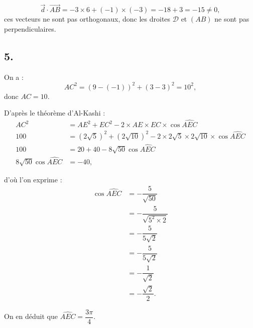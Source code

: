 \[
\vec{d} \cdot \overrightarrow{AB} = -3 \times 6 + (-1) \times (-3) = -18 + 3 = -15 \neq 0,
\]
ces vecteurs ne sont pas orthogonaux, donc les droites \( \mathcal{D} \) et \( (AB) \) ne sont pas perpendiculaires.

\subsection*{5.}

On a :
\[AC^2 = (9 - (-1))^2 + (3 - 3)^2 = 10^2,
\]
donc \( AC = 10 \).

D'après le théorème d'Al-Kashi :
\begin{align*}
AC^2 &= AE^2 + EC^2 - 2 \times AE \times EC \times \cos \widehat{AEC} \\
100 &= \left(2\sqrt{5}\right)^2 + \left(2\sqrt{10}\right)^2 - 2 \times 2\sqrt{5} \times 2\sqrt{10} \times \cos \widehat{AEC} \\
100 &= 20 + 40 - 8\sqrt{50} \cos \widehat{AEC} \\
8\sqrt{50} \cos \widehat{AEC} &= -40,
\end{align*}

d'où l'on exprime :
\begin{align*}
\cos \widehat{AEC} &= -\dfrac{5}{\sqrt{50}} \\
&= -\dfrac{5}{\sqrt{5^2 \times 2}} \\
&= -\dfrac{5}{5\sqrt{2}} \\
&= -\dfrac{5}{5\sqrt{2}} \\
&= -\dfrac{1}{\sqrt{2}} \\
&= -\dfrac{\sqrt{2}}{2}.
\end{align*}

On en déduit que \( \widehat{AEC} = \dfrac{3\pi}{4} \).
